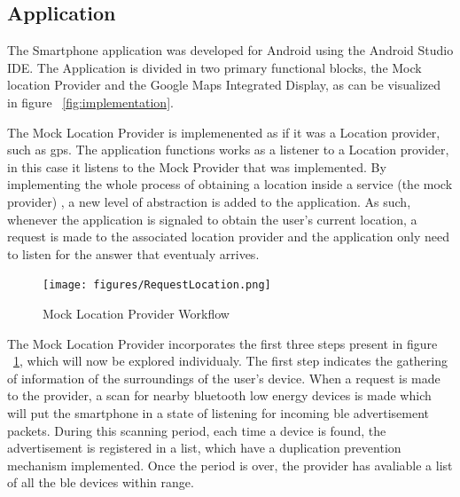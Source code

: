 \documentclass[a4paper]{IEEEtran}
\begin{document}
\subsection{ Application}
\label{subsec:app}

The Smartphone application was developed for Android using the Android Studio IDE. The Application is divided in two primary functional blocks, the Mock location Provider and the Google Maps Integrated Display, as can be visualized in figure ~\ref{fig:implementation}.

The Mock Location Provider is implemenented as if it was a Location provider, such as gps. The application functions works as a listener to a Location provider, in this case it listens to the Mock Provider that was implemented. By implementing the whole process of obtaining a location inside a service (the mock provider) , a new level of abstraction is added to the application. As such, whenever the application is signaled to obtain the user's current location, a request is made to the associated location provider and the application only need to listen for the answer that eventualy arrives.

\begin{figure}
	\centering
		\texttt{[image: figures/RequestLocation.png]}
	\caption[Mock Location Provider Workflow]{Mock Location Provider Workflow}
	\label{fig:MockProvider}
\end{figure}

The Mock Location Provider incorporates the first three steps present in figure ~\ref{fig:MockProvider}, which will now be explored individualy. The first step indicates the gathering of information of the surroundings of the user's device. When a request is made to the provider, a scan for nearby bluetooth low energy devices is made which will put the smartphone in a state of listening for incoming ble advertisement packets. During this scanning period, each time a device is found, the advertisement is registered in a list, which have a duplication prevention mechanism implemented. Once the period is over, the provider has avaliable a list of all the ble devices within range.   
\end{document}
